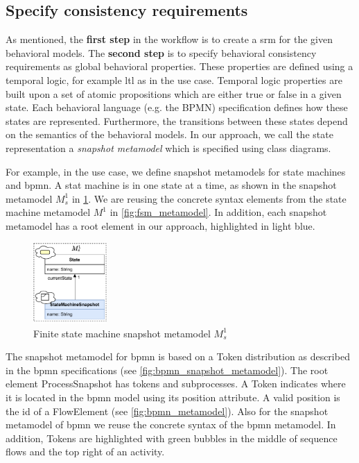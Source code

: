 \documentclass{jot}
\begin{document}
\subsection{Specify consistency requirements}
As mentioned, the \textbf{first step} in the workflow is to create a \gls*{srm} for the given behavioral models.
The \textbf{second step} is to specify behavioral consistency requirements as global behavioral properties.
These properties are defined using a temporal logic, for example \gls*{ltl} as in the use case.
Temporal logic properties are built upon a set of atomic propositions which are either true or false in a given state.
Each behavioral language (e.g. the BPMN) specification defines how these states are represented.
Furthermore, the transitions between these states depend on the semantics of the behavioral models.
In our approach, we call the state representation a \emph{snapshot metamodel} which is specified using class diagrams.

For example, in the use case, we define snapshot metamodels for state machines and \gls*{bpmn}.
A stat machine is in one state at a time, as shown in the snapshot metamodel $M_s^1$ in \cref{fig:fsm_snapshot_metamodel}.
We are reusing the concrete syntax elements from the state machine metamodel $M^1$ in \cref{fig:fsm_metamodel}.
In addition, each snapshot metamodel has a root element in our approach, highlighted in light blue.
\begin{figure}[h]
    \centering
    \includegraphics[width=0.25\textwidth]{figures/state_machine_snapshot_metamodel.pdf}
    \caption{Finite state machine snapshot metamodel $M_s^1$}
    \label{fig:fsm_snapshot_metamodel}
\end{figure}

The snapshot metamodel for \gls*{bpmn} is based on a \textsf{Token} distribution as described in the \gls*{bpmn} specifications \cite{objectmanagementgroupBusinessProcessModel2013} (see \cref{fig:bpmn_snapshot_metamodel}). 
The root element \textsf{ProcessSnapshot} has \textsf{tokens} and \textsf{subprocesses}.
A \textsf{Token} indicates where it is located in the \gls*{bpmn} model using its \textsf{position} attribute.
A valid \textsf{position} is the \textsf{id} of a \textsf{FlowElement} (see \cref{fig:bpmn_metamodel}).
Also for the snapshot metamodel of \gls*{bpmn} we reuse the concrete syntax of the \gls*{bpmn} metamodel.
In addition, \textsf{Token}s are highlighted with green bubbles in the middle of sequence flows and the top right of an activity.
\end{document}
